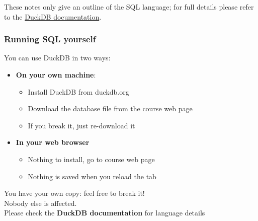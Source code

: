 These notes only give an outline of the SQL language; for full details please refer to the \href{https://duckdb.org/docs/current/sql/introduction}{DuckDB documentation}.

\begin{frame}
    \label{s:running-duckdb}
    \frametitle{Running SQL yourself}
    You can use DuckDB in two ways:
    \begin{itemize}
        \item \textbf{On your own machine}:
            \begin{itemize}
                \item Install DuckDB from duckdb.org
                \item Download the database file from the course web page
                \item If you break it, just re-download it\\[0.5em]\pause
            \end{itemize}
        \item \textbf{In your web browser} 
            \begin{itemize}
                \item Nothing to install, go to course web page
                \item Nothing is saved when you reload the tab\\[1em]
            \end{itemize}
    \end{itemize}
    You have your own copy: feel free to break it!\\
    Nobody else is affected.\\[1em]\pause
    Please check the \textbf{DuckDB documentation} for language details
\end{frame}
\label{l:running-duckdb}

